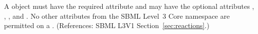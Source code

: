 A \KineticLaw object must have the required attribute  and may
have the optional attributes , , ,
 and .  No other attributes from the SBML Level~3
Core namespace are permitted on a \KineticLaw.  (References: SBML L3V1
Section~\ref{sec:reactions}.)
